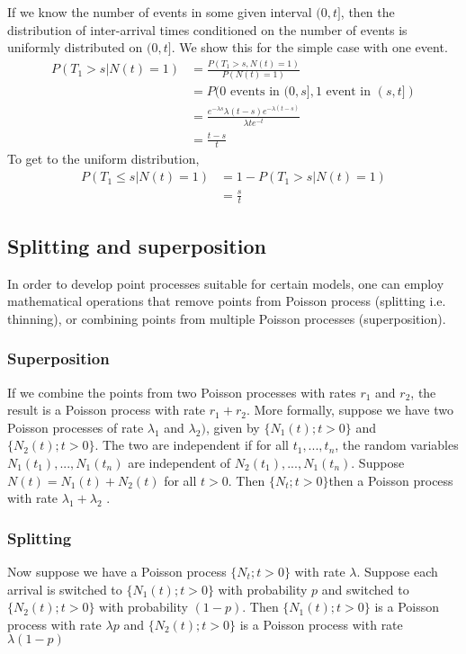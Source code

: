 \documentclass[12pt]{report}
\begin{document}
If we know the number of events in some given interval $(0,t]$, then the distribution of inter-arrival times conditioned on the number of events is uniformly distributed on $(0,t]$. We show this for the simple case with one event.
\begin{align*}
P(T_1 > s | N(t) = 1) &= \frac{P(T_1 > s , N(t) = 1)}{P(N(t) = 1)}\\
&=P(0 \text{ events in } (0,s], 1 \text{ event in } (s, t] )\\
&= \frac{e^{-\lambda s} \lambda (t-s) e^{-\lambda(t-s)} }{\lambda t e^{-t}}\\
&= \frac{t-s}{t}
\end{align*}
To get to the uniform distribution, 
\begin{align*}
P(T_1 \le s | N(t) = 1) &= 1- P(T_1 > s |N(t) =1)\\
&=\frac{s}{t}
\end{align*}

\renewcommand{\vec}[1]{\mathbf{#1}}

\subsection{Splitting and superposition}
In order to develop point processes suitable for certain models, one can employ mathematical operations that remove points from Poisson process (splitting i.e. thinning), or combining points from multiple Poisson processes (superposition).

\subsubsection{Superposition}
If we combine the points from two Poisson processes with rates $r_1$ and $r_2$, the result is a Poisson process with rate $r_1 + r_2$. More formally, suppose we have two Poisson processes of rate $\lambda_1$ and $\lambda_2)$, given by $\{N_1(t) ; t>0\}$ and $\{N_2(t) ; t>0\}$. The two are independent if for all $t_1, ..., t_n$, the random variables $N_1(t_1),...,N_1(t_n)$ are independent of $N_2(t_1),...,N_1(t_n)$. Suppose $N(t) = N_1(t) + N_2(t)$ for all $t>0$. Then $\{N_t; t>0\} $then a Poisson process with rate $\lambda_1+\lambda_2$ .\

\subsubsection{Splitting}
Now suppose we have a Poisson process $\{N_t; t>0\}$ with rate $\lambda$. Suppose each arrival is switched to $\{N_1(t) ; t>0\}$ with probability $p$ and switched to $\{N_2(t) ; t>0\}$ with probability $(1-p)$. Then $\{N_1(t) ; t>0\}$ is a Poisson process with rate $\lambda p$ and $\{N_2(t) ; t>0\}$ is a Poisson process with rate $\lambda (1-p)$
\end{document}
